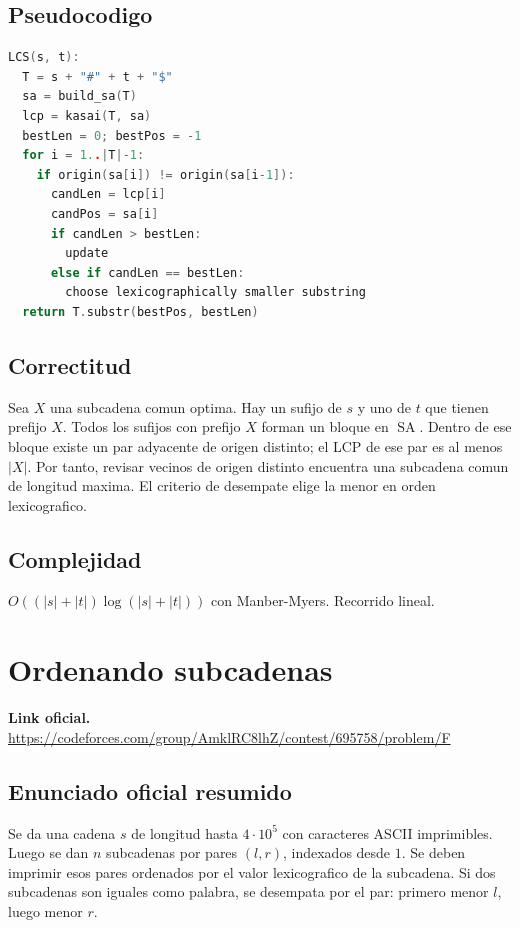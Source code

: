 \documentclass[10pt]{article}
\newcommand{\bigO}{O}
\newcommand{\SA}{\operatorname{SA}}
\begin{document}
\subsection{Pseudocodigo}
\begin{lstlisting}[language=C++]
LCS(s, t):
  T = s + "#" + t + "$"
  sa = build_sa(T)
  lcp = kasai(T, sa)
  bestLen = 0; bestPos = -1
  for i = 1..|T|-1:
    if origin(sa[i]) != origin(sa[i-1]):
      candLen = lcp[i]
      candPos = sa[i]
      if candLen > bestLen:
        update
      else if candLen == bestLen:
        choose lexicographically smaller substring
  return T.substr(bestPos, bestLen)
\end{lstlisting}

\subsection{Correctitud}
Sea $X$ una subcadena comun optima. Hay un sufijo de $s$ y uno de $t$ que
tienen prefijo $X$. Todos los sufijos con prefijo $X$ forman un bloque en
$\SA$. Dentro de ese bloque existe un par adyacente de origen distinto; el LCP
de ese par es al menos $|X|$. Por tanto, revisar vecinos de origen distinto
encuentra una subcadena comun de longitud maxima. El criterio de desempate
elige la menor en orden lexicografico.

\subsection{Complejidad}
$\bigO((|s|+|t|)\log(|s|+|t|))$ con Manber-Myers. Recorrido lineal.

\newpage

\section{Ordenando subcadenas}
\textbf{Link oficial.} \url{https://codeforces.com/group/AmklRC8lhZ/contest/695758/problem/F}

\subsection{Enunciado oficial resumido}
Se da una cadena $s$ de longitud hasta $4\cdot 10^5$ con caracteres ASCII
imprimibles. Luego se dan $n$ subcadenas por pares $(l,r)$, indexados desde $1$.
Se deben imprimir esos pares ordenados por el valor lexicografico de la
subcadena. Si dos subcadenas son iguales como palabra, se desempata por el par:
primero menor $l$, luego menor $r$.
\end{document}
